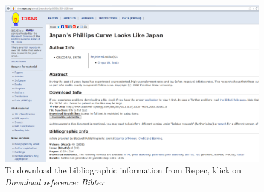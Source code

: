 \documentclass[a4paper,12pt]{scrartcl} %
\begin{document}
\begin{figure}[h!] %
\includegraphics[scale=0.3]{Ideas}  %
\caption[Title for List of Figures]{To download the bibliographic information from Repec, klick on \emph{Download reference: Bibtex}}\label{fig:Ideas1} %
\end{figure}
\end{document}
